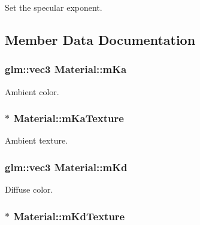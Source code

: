 Set the specular exponent. 



\subsection{Member Data Documentation}
\hypertarget{class_material_a16630877735280179accbacf77276e07}{
\subsubsection[{m\+Ka}]{\setlength{\rightskip}{0pt plus 5cm}glm\+::vec3 Material\+::m\+Ka\hspace{0.3cm}{\ttfamily [private]}}}\label{class_material_a16630877735280179accbacf77276e07}


Ambient color. 

\hypertarget{class_material_ad9c856c3be629bfe3399ab32abdc83bc}{
\subsubsection[{m\+Ka\+Texture}]{$\ast$ Material\+::m\+Ka\+Texture\hspace{0.3cm}{\ttfamily [private]}}}\label{class_material_ad9c856c3be629bfe3399ab32abdc83bc}


Ambient texture. 

\hypertarget{class_material_ad19d4445f12608edad69831c54a5f824}{
\subsubsection[{m\+Kd}]{\setlength{\rightskip}{0pt plus 5cm}glm\+::vec3 Material\+::m\+Kd\hspace{0.3cm}{\ttfamily [private]}}}\label{class_material_ad19d4445f12608edad69831c54a5f824}


Diffuse color. 

\hypertarget{class_material_a50a88a1bc4f43f5862d55b93222311b9}{
\subsubsection[{m\+Kd\+Texture}]{$\ast$ Material\+::m\+Kd\+Texture\hspace{0.3cm}{\ttfamily [private]}}}\label{class_material_a50a88a1bc4f43f5862d55b93222311b9}


